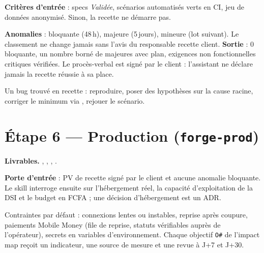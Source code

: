 \textbf{Critères d'entrée} : specs \emph{Validée}, scénarios automatisés verts en CI, jeu de données anonymisé. Sinon, la recette ne démarre pas.

\textbf{Anomalies} : bloquante (48\,h), majeure (5\,jours), mineure (lot suivant). Le classement ne change jamais sans l'avis du responsable recette client. \textbf{Sortie} : 0 bloquante, un nombre borné de majeures avec plan, exigences non fonctionnelles critiques vérifiées. Le procès-verbal est signé par le client : l'assistant ne déclare jamais la recette réussie à sa place.

Un bug trouvé en recette : reproduire, poser des hypothèses sur la cause racine, corriger le minimum via , rejouer le scénario.

\section{Étape 6 --- Production (\texttt{forge-prod})}
\textbf{Livrables.} , , , .

\textbf{Porte d'entrée} : PV de recette signé par le client et aucune anomalie bloquante. Le skill interroge ensuite sur l'hébergement réel, la capacité d'exploitation de la DSI et le budget en FCFA ; une décision d'hébergement est un ADR.

Contraintes par défaut : connexions lentes ou instables, reprise après coupure, paiements Mobile Money (file de reprise, statuts vérifiables auprès de l'opérateur), secrets en variables d'environnement. Chaque objectif \texttt{O\#} de l'impact map reçoit un indicateur, une source de mesure et une revue à J+7 et J+30.

